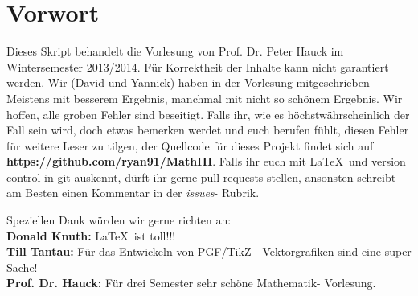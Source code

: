 \chapter*{Vorwort}

Dieses Skript behandelt die Vorlesung  von Prof. Dr. Peter
Hauck im Wintersemester 2013/2014. Für Korrektheit der Inhalte kann nicht
garantiert werden. Wir (David und Yannick) haben in der Vorlesung
mitgeschrieben - Meistens mit besserem Ergebnis, manchmal mit nicht so schönem
Ergebnis. Wir hoffen, alle groben Fehler sind beseitigt. Falls ihr, wie es
höchstwährscheinlich der Fall sein wird, doch etwas bemerken werdet und euch
berufen fühlt, diesen Fehler für weitere Leser zu tilgen, der Quellcode für
dieses Projekt findet sich auf \textbf{https://github.com/ryan91/MathIII}.
Falls ihr euch mit \LaTeX\ und version control in git auskennt, dürft ihr gerne
pull requests stellen, ansonsten schreibt am Besten einen Kommentar in der
\textit{issues}- Rubrik.

Speziellen Dank würden wir gerne richten an:\\
\textbf{Donald Knuth:} \LaTeX\ ist toll!!!\\
\textbf{Till Tantau:} Für das Entwickeln von PGF/TikZ - Vektorgrafiken sind
eine super Sache!\\
\textbf{Prof. Dr. Hauck:} Für drei Semester sehr schöne Mathematik- Vorlesung.
